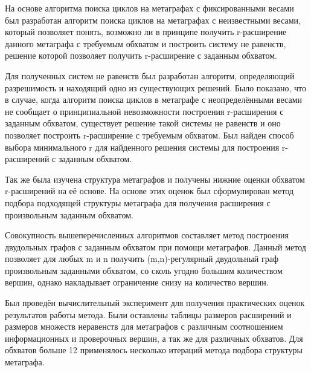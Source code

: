 \documentclass[14pt]{mmcs-article}
\begin{document}
На основе алгоритма поиска циклов на метаграфах с фиксированными весами был разработан алгоритм поиска циклов на метаграфах с неизвестными весами, который позволяет понять, возможно ли в принципе получить r-расширение данного метаграфа с   требуемым обхватом и построить систему не равенств, решение которой позволяет получить r-расширение с заданным обхватом. 

Для полученных систем не равенств был разработан алгоритм, определяющий разрешимость и находящий одно из существующих решений. Было показано, что в случае, когда алгоритм поиска циклов в метаграфе с неопределёнными весами не сообщает о принципиальной невозможности построения r-расширения с заданным обхватом, существует решение такой системы не равенств и оно позволяет построить r-расширение с требуемым обхватом. Был найден способ выбора минимального r для найденного решения системы для построения r-расширений с заданным обхватом. 

Так же была изучена структура метаграфов и получены нижние оценки обхватом r-расширений на её основе. На основе этих оценок был сформулирован метод подбора подходящей структуры метаграфа для получения расширения с произвольным заданным обхватом.

Совокупность вышеперечисленных алгоритмов составляет метод построения двудольных графов с заданным обхватом при помощи метаграфов. Данный метод позволяет для любых m и n получить (m,n)-регулярный двудольный граф произвольным заданными обхватом, со сколь угодно большим количеством вершин, однако накладывает ограничение снизу на количество вершин.

Был проведён вычислительный эксперимент для получения практических оценок результатов работы метода. Были оставлены таблицы размеров расширений и размеров множеств неравенств для метаграфов с различным соотношением информационных и проверочных вершин, а так же для различных обхватов. Для обхватов больше 12 применялось несколько итераций метода подбора структуры метаграфа.  

\newpage

\renewcommand{\refname}{\centering \textbf{Литература}}
\end{document}
